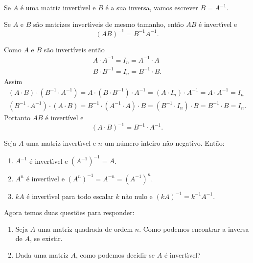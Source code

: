 \begin{notacao}
    Se $A$ \'e uma matriz invert{\'\i}vel e $B$ \'e a sua inversa, vamos escrever $B = A^{-1}$.
\end{notacao}

\begin{proposicao}
    Se $A$ e $B$ s\~ao matrizes invert{\'\i}veis de mesmo tamanho, ent\~ao $AB$ \'e invert{\'\i}vel e
    \[
        (AB)^{-1} = B^{-1} A^{-1}.
    \]
\end{proposicao}
\begin{prova}
    Como $A$ e $B$ são invertíveis então
    \begin{align*}
        A\cdot A^{-1} = I_n = A^{-1}\cdot A\\
        B\cdot B^{-1} = I_n = B^{-1}\cdot B.
    \end{align*}
    Assim
    \begin{align*}
        (A\cdot B)\cdot (B^{-1}\cdot A^{-1}) = A \cdot (B \cdot B^{-1})\cdot A^{-1} = (A \cdot I_n) \cdot A^{-1} = A\cdot A^{-1} = I_n\\
        (B^{-1}\cdot A^{-1}) \cdot (A\cdot B) = B^{-1}\cdot (A^{-1} \cdot A)\cdot B = (B^{-1} \cdot I_n) \cdot B = B^{-1}\cdot B = I_n.
    \end{align*}
    Portanto $AB$ é invertível e
    \[
        (A\cdot B)^{-1} = B^{-1}\cdot A^{-1}.
    \]
\end{prova}

\begin{proposicao}
    Seja $A$ uma matriz invert{\'\i}vel e $n$ um n\'umero inteiro n\~ao negativo. Ent\~ao:
    \begin{enumerate}[label={\roman*})]
        \item $A^{-1}$ \'e invert{\'\i}vel e $(A^{-1})^{-1} = A$.

        \item $A^n$ \'e invert{\'\i}vel e $(A^n)^{-1} = A^{-n} = (A^{-1})^n$.

        \item $kA$ \'e invert{\'\i}vel para todo escalar $k$ n\~ao nulo e $(kA)^{-1} = k^{-1}A^{-1}$.
    \end{enumerate}
\end{proposicao}

Agora temos duas questões para responder:
\begin{enumerate}[label={\arabic*})]
    \item Seja $A$ uma matriz quadrada de ordem $n$. Como podemos encontrar a inversa de $A$, se existir.

    \item Dada uma matriz $A$, como podemos decidir se $A$ \'e invert{\'\i}vel?
\end{enumerate}

